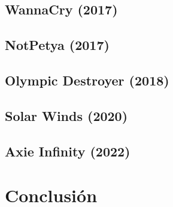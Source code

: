 \documentclass{article}
\begin{document}
\subsection{WannaCry (2017)}

\subsection{NotPetya (2017)}

\subsection{Olympic Destroyer (2018)}

\subsection{Solar Winds (2020)}

\subsection{Axie Infinity (2022)}

\section{Conclusión}

\newpage
\printbibliography
\end{document}
